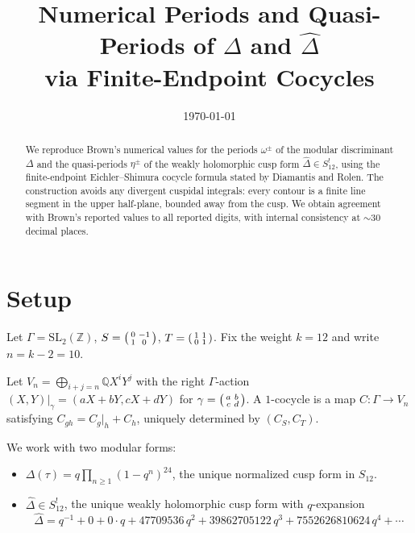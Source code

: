 \documentclass[11pt,letterpaper]{article}
\title{Numerical Periods and Quasi-Periods of $\Delta$ and $\widehat{\Delta}$ \\[0.3em]
       via Finite-Endpoint Cocycles}
\author{}
\date{\today}
\newcommand{\ZZ}{\mathbb{Z}}
\newcommand{\QQ}{\mathbb{Q}}
\newcommand{\SLZ}{\mathrm{SL}_2(\ZZ)}
\newcommand{\Dhat}{\widehat{\Delta}}
\begin{document}
\maketitle

\begin{abstract}
We reproduce Brown's numerical values for the periods $\omega^\pm$ of the modular discriminant $\Delta$ and the quasi-periods $\eta^\pm$ of the weakly holomorphic cusp form $\Dhat \in S_{12}^{!}$, using the finite-endpoint Eichler--Shimura cocycle formula stated by Diamantis and Rolen. The construction avoids any divergent cuspidal integrals: every contour is a finite line segment in the upper half-plane, bounded away from the cusp. We obtain agreement with Brown's reported values to all reported digits, with internal consistency at $\sim$30 decimal places.
\end{abstract}

\section{Setup}

Let $\Gamma = \SLZ$, $S = \begin{psmallmatrix}0 & -1 \\ 1 & 0\end{psmallmatrix}$, $T = \begin{psmallmatrix}1 & 1 \\ 0 & 1\end{psmallmatrix}$. Fix the weight $k = 12$ and write $n = k - 2 = 10$.

Let $V_{n} = \bigoplus_{i+j=n} \QQ X^i Y^j$ with the right $\Gamma$-action $(X,Y)\big|_\gamma = (aX+bY, cX+dY)$ for $\gamma = \begin{psmallmatrix}a&b\\c&d\end{psmallmatrix}$. A $1$-cocycle is a map $C : \Gamma \to V_n$ satisfying $C_{gh} = C_g\big|_h + C_h$, uniquely determined by $(C_S, C_T)$.

We work with two modular forms:
\begin{itemize}[itemsep=0pt]
  \item $\Delta(\tau) = q\prod_{n\ge 1}(1-q^n)^{24}$, the unique normalized cusp form in $S_{12}$.
  \item $\Dhat \in S_{12}^{!}$, the unique weakly holomorphic cusp form with $q$-expansion
  \begin{equation}\label{eq:Dhat-target}
    \Dhat = q^{-1} + 0 + 0\cdot q + 47709536\, q^2 + 39862705122\, q^3 + 7552626810624\, q^4 + \cdots
  \end{equation}
\end{itemize}
\end{document}

